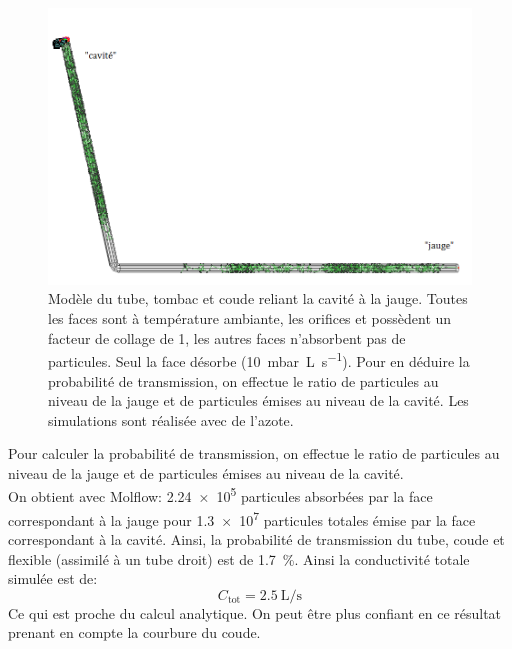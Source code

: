 \begin{figure}
    \centering
    \includegraphics[width = .75\textwidth]{Figures/tube.PNG}
        \caption[Modèle du tube, tombac et coude reliant la cavité à la jauge.]{Modèle du tube, tombac et coude reliant la cavité à la jauge. Toutes les faces sont à température ambiante, les orifices  et  possèdent un facteur de collage de 1, les autres faces n'absorbent pas de particules. Seul la face  désorbe (\SI{10}{\milli\bar.\liter\per\second}). Pour en déduire la probabilité de transmission, on effectue le ratio de particules  au niveau de la jauge et de particules émises au niveau de la cavité. Les simulations sont réalisée avec de l'azote.}
    \label{fig:simTube}
\end{figure}

Pour calculer la probabilité de transmission, on effectue le ratio de particules  au niveau de la jauge et de particules émises au niveau de la cavité.\\
On obtient avec Molflow: \num{2.24e5} particules absorbées par la face correspondant à la jauge pour \num{1.3e7} particules totales émise par la face correspondant à la cavité. Ainsi, la probabilité de transmission du tube, coude et flexible (assimilé à un tube droit) est de \SI{1.7}{\percent}. Ainsi la conductivité totale simulée est de:
\[C_\text{tot} = \SI{2.5}{\liter\per\second}\]
Ce qui est proche du calcul analytique. On peut être plus confiant en ce résultat prenant en compte la courbure du coude.

